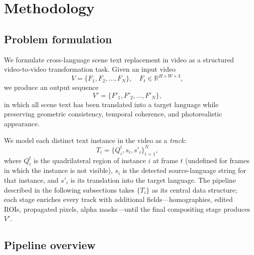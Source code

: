 \section{Methodology}
\label{sec:method}

\subsection{Problem formulation}
\label{sec:method:formulation}

We formulate cross-language scene text replacement in video as a
structured video-to-video transformation task. Given an input
video
\begin{equation}
  V = \{F_1, F_2, \dots, F_N\}, \quad
  F_t \in \mathbb{R}^{H \times W \times 3},
\end{equation}
we produce an output sequence
\begin{equation}
  V' = \{F'_1, F'_2, \dots, F'_N\},
\end{equation}
in which all scene text has been translated into a target language
while preserving geometric consistency, temporal coherence, and
photorealistic appearance.

We model each distinct text instance in the video as a
\emph{track}:
\begin{equation}
  T_i = \{Q_i^t, s_i, s'_i\}_{t=1}^{N},
  \label{eq:track}
\end{equation}
where $Q_i^t$ is the quadrilateral region of instance $i$ at
frame $t$ (undefined for frames in which the instance is not
visible), $s_i$ is the detected source-language string for that
instance, and $s'_i$ is its translation into the target language.
The pipeline described in the following subsections takes
$\{T_i\}$ as its central data structure; each stage enriches every
track with additional fields---homographies, edited ROIs,
propagated pixels, alpha masks---until the final compositing stage
produces $V'$.

\subsection{Pipeline overview}
\label{sec:method:overview}

